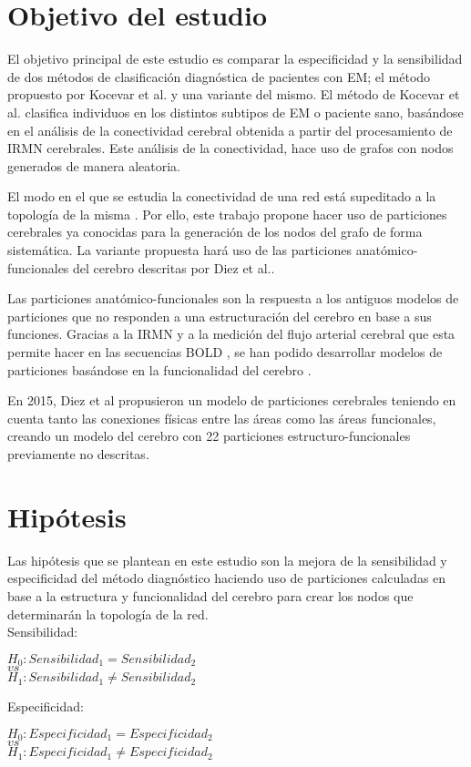 \documentclass[fleqn,12pt]{uicarticle} %
\begin{document}
\section{Objetivo del estudio}

El objetivo principal de este estudio es comparar la especificidad y la sensibilidad de dos métodos de clasificación diagnóstica de pacientes con EM; el método propuesto por Kocevar et al.\cite{Kocevar2016} y una variante del mismo. El método de Kocevar et al.\cite{Kocevar2016} clasifica individuos en los distintos subtipos de EM o paciente sano, basándose en el análisis de la conectividad cerebral obtenida a partir del procesamiento de IRMN cerebrales. Este análisis de la conectividad, hace uso de grafos con nodos generados de manera aleatoria.

El modo en el que se estudia la conectividad de una red está supeditado a la topología de la misma \cite{Fornito, Zalesky2010}. Por ello, este trabajo propone hacer uso de particiones cerebrales ya conocidas para la generación de los nodos del grafo de forma sistemática. La variante propuesta hará uso de las particiones anatómico-funcionales del cerebro descritas por Diez et al.\cite{Diez2015}.

Las particiones anatómico-funcionales son la respuesta a los antiguos modelos de particiones que no responden a una estructuración del cerebro en base a sus funciones. Gracias a la IRMN y a la medición del flujo arterial cerebral que esta permite hacer en las secuencias BOLD \cite{Ogawa1990}, se han podido desarrollar modelos de particiones basándose en la funcionalidad del cerebro \cite{Heller2006}.

En 2015, Diez et al \cite{Diez2015} propusieron un modelo de particiones cerebrales teniendo en cuenta tanto las conexiones físicas entre las áreas como las áreas funcionales, creando un modelo del cerebro con 22 particiones estructuro-funcionales previamente no descritas. 


\section{Hipótesis}

Las hipótesis que se plantean en este estudio son la mejora de la sensibilidad y especificidad del método diagnóstico haciendo uso de particiones calculadas en base a la estructura y funcionalidad del cerebro para crear los nodos que determinarán la topología de la red. 
\vspace{1em} \\
Sensibilidad:
\begin{center}
$H_0: Sensibilidad_1 = Sensibilidad_2$ \\
$vs$ \\
$H_1: Sensibilidad_1 \neq Sensibilidad_2$
\end{center}
Especificidad:
\begin{center}
$H_0: Especificidad_1 = Especificidad_2$ \\
$vs$ \\
$H_1: Especificidad_1 \neq Especificidad_2$
\end{center}
\end{document}
